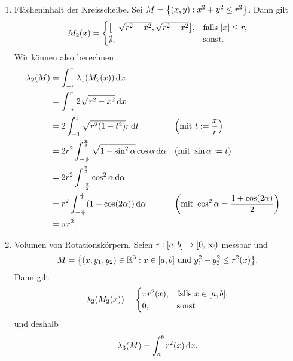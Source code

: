 \begin{example}
	\begin{enumerate}
		\item Flächeninhalt der Kreisscheibe.
		Sei \(M = \braces*{\parentheses*{x, y} : x^2 + y^2 \le r^2}\).
		Dann gilt
		\[
			M_2\parentheses*{x} = \begin{cases}
				\brackets*{-\sqrt{r^2 - x^2}, \sqrt{r^2 - x^2}}, & \text{falls }\absolute*{x} \le r,\\
				\emptyset, & \text{sonst}.
			\end{cases}
		\]
		Wir können also berechnen
		\begin{align}
			\lambda_2\parentheses*{M} &= \int_{-r}^r \lambda_1\parentheses*{M_2\parentheses*{x}}\d x\nonumber\\
			&= \int_{-r}^r 2\sqrt{r^2 - x^2}\d x\nonumber\\
			&= 2\int_{-1}^1 \sqrt{r^2\parentheses*{1 - t^2}}r\d t &&\parentheses*{\text{mit }t := \frac{x}{r}}\nonumber\\
			&= 2r^2\int_{-\frac{\pi}{2}}^{\frac{\pi}{2}}\sqrt{1 - \sin^2 \alpha}\cos\alpha\d\alpha &&\parentheses*{\text{mit }\sin\alpha := t}\nonumber\\
			&= 2r^2\int_{-\frac{\pi}{2}}^{\frac{\pi}{2}}\cos^2 \alpha\d\alpha\nonumber\\
			&= r^2\int_{-\frac{\pi}{2}}^{\frac{\pi}{2}}\parentheses*{1 + \cos\parentheses*{2\alpha}}\d\alpha &&\parentheses*{\text{mit }\cos^2 \alpha = \frac{1 + \cos\parentheses*{2\alpha}}{2}}\nonumber\\
			&= \pi r^2.
		\end{align}
		\item Volumen von Rotationskörpern.
		Seien \(r: \brackets*{a, b} \to \left[0, \infty\right)\) messbar und
		\[
			M = \braces*{\parentheses*{x, y_1, y_2} \in \R^3 : x \in \brackets*{a, b}\text{ und }y_1^2 + y_2^2 \le r^2\parentheses*{x}}.
		\]
		Dann gilt
		\begin{equation}
			\lambda_2\parentheses*{M_2\parentheses*{x}} = \begin{cases}
				\pi r^2\parentheses*{x}, & \text{falls }x \in \brackets*{a, b},\\
				0, & \text{sonst}
			\end{cases}
		\end{equation}
		und deshalb
		\begin{equation}
			\lambda_3\parentheses*{M} = \int_a^b r^2\parentheses*{x}\d x.
		\end{equation}
	\end{enumerate}
\end{example}

